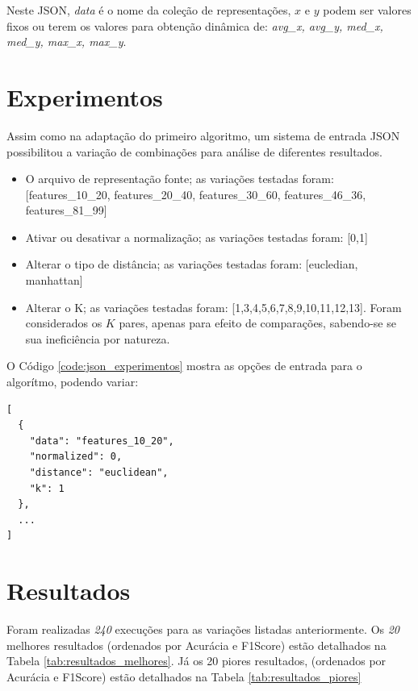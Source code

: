 \documentclass[12pt]{article}
\begin{document}
Neste JSON, \textit{data} é o nome da coleção de representações, $x$ e $y$ podem ser valores fixos ou terem os valores para obtenção dinâmica de: \textit{avg\_x, avg\_y, med\_x, med\_y, max\_x, max\_y}.

\section{Experimentos}

Assim como na adaptação do primeiro algoritmo, um sistema de entrada JSON possibilitou a variação de combinações para análise de diferentes resultados.

\begin{itemize}
  \item O arquivo de representação fonte; as variações testadas foram: [features\_10\_20, features\_20\_40, features\_30\_60, features\_46\_36, features\_81\_99]
  \item Ativar ou desativar a normalização; as variações testadas foram: [0,1]
  \item Alterar o tipo de distância; as variações testadas foram: [eucledian, manhattan]
  \item Alterar o K; as variações testadas foram: [1,3,4,5,6,7,8,9,10,11,12,13]. Foram considerados os $K$ pares, apenas para efeito de comparações, sabendo-se se sua ineficiência por natureza.
\end{itemize}

\newpage

O Código \ref{code:json_experimentos} mostra as opções de entrada para o algorítmo, podendo variar:

\begin{lstlisting}[caption={JSON para experimentos},captionpos=b,frame=single,label={code:json_experimentos}]
[
  {
    "data": "features_10_20",
    "normalized": 0,
    "distance": "euclidean",
    "k": 1
  },
  ...
]
\end{lstlisting}

\section{Resultados}

Foram realizadas \textit{240} execuções para as variações listadas anteriormente. Os \textit{20} melhores resultados (ordenados por Acurácia e F1Score) estão detalhados na Tabela \ref{tab:resultados_melhores}. Já os 20 piores resultados,  (ordenados por Acurácia e F1Score) estão detalhados na Tabela \ref{tab:resultados_piores}
\end{document}

